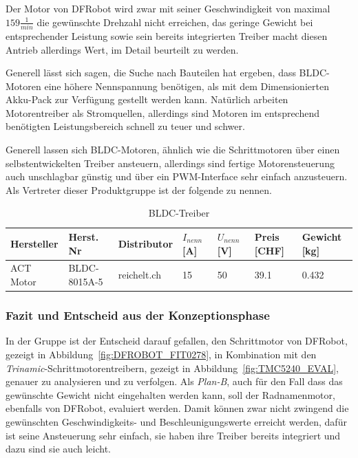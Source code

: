 \documentclass[main.tex]{subfiles} %
\begin{document}
Der Motor von DFRobot wird zwar mit seiner Geschwindigkeit von maximal $159
    \frac{1}{min}$ die gewünschte Drehzahl nicht erreichen, das geringe Gewicht bei
entsprechender Leistung sowie sein bereits integrierten Treiber macht diesen
Antrieb allerdings Wert, im Detail beurteilt zu werden.

Generell lässt sich sagen, die Suche nach Bauteilen hat ergeben, dass
BLDC-Motoren eine höhere Nennspannung benötigen, als mit dem Dimensionierten
Akku-Pack zur Verfügung gestellt werden kann. Natürlich arbeiten Motorentreiber
als Stromquellen, allerdings sind Motoren im entsprechend benötigten
Leistungsbereich schnell zu teuer und schwer.

Generell lassen sich BLDC-Motoren, ähnlich wie die Schrittmotoren über einen
selbstentwickelten Treiber ansteuern, allerdings sind fertige Motorensteuerung
auch unschlagbar günstig und über ein PWM-Interface sehr einfach anzusteuern.
Als Vertreter dieser Produktgruppe ist der folgende zu nennen.

\begin{table}[h]
    \centering
    \begin{tabular}{|p{2cm}|p{3cm}|p{2cm}|p{1cm}|p{1cm}|p{1cm}|p{1.5cm}|}
        \hline
        Hersteller & Herst. Nr    & Distributor & $I_{nenn} $ [A] & $U_{nenn}$ [V] & Preis [CHF] & Gewicht [kg] \\ \hline
        ACT Motor  & BLDC-8015A-5 & reichelt.ch & 15              & 50             & 39.1        & 0.432        \\ \hline
    \end{tabular}
    \caption{BLDC-Treiber}
\end{table}

\subsubsection{Fazit und Entscheid aus der Konzeptionsphase}  %

In der Gruppe ist der Entscheid darauf gefallen, den Schrittmotor von DFRobot,
gezeigt in Abbildung~\ref{fig:DFROBOT_FIT0278}, in Kombination mit den
\textit{Trinamic}-Schrittmotorentreibern, gezeigt in
Abbildung~\ref{fig:TMC5240_EVAL}, genauer zu analysieren und zu verfolgen. Als
\textit{Plan-B}, auch für den Fall dass das gewünschte Gewicht nicht
eingehalten werden kann, soll der Radnamenmotor, ebenfalls von DFRobot,
evaluiert werden. Damit können zwar nicht zwingend die gewünschten
Geschwindigkeits- und Beschleunigungswerte erreicht werden, dafür ist seine
Ansteuerung sehr einfach, sie haben ihre Treiber bereits integriert und dazu
sind sie auch leicht.
\end{document}
